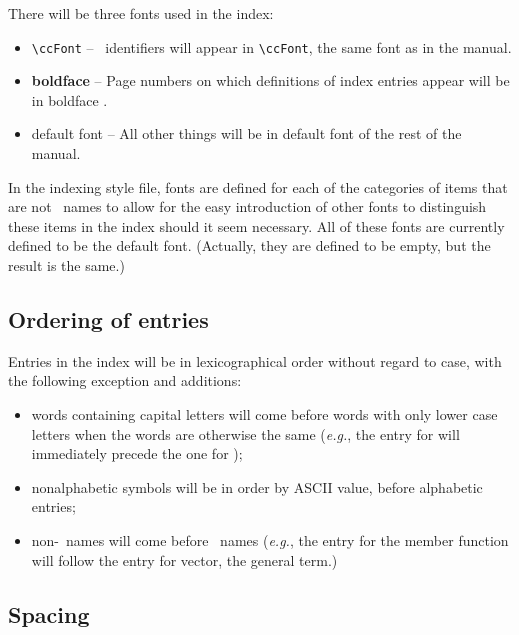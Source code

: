 \documentclass[11pt]{article}
\begin{document}
There will be three fonts used in the index:
\begin{itemize}
   \item {\verb|\ccFont| } -- \CC\ identifiers will appear in \verb|\ccFont|,
         the same font as in the manual.
   \item {\bf boldface} -- Page numbers on which definitions
         of index entries appear will be in boldface%
         .
   \item {default font} -- All other things will be in default font
         of the rest of the manual.
\end{itemize}

In the indexing style file, fonts are defined for each of the categories
of items that are not \CC\ names to allow for the easy introduction of other
fonts to distinguish these items in the index should it seem necessary.  
All of these fonts are currently defined to be the default font.
(Actually, they are defined to be empty, but the result is the same.)%

\subsection{Ordering of entries}%
%
\label{ordering}

Entries in the index will be in lexicographical order without regard to
case, with the following exception and additions:  
\begin{itemize}
   \item words containing capital letters will come before words with
         only lower case letters when the words
         are otherwise the same
         ({\em e.g.}, the entry for  will 
          immediately precede the one for );
   \item nonalphabetic symbols will be in order by ASCII value, before 
         alphabetic entries;  
   \item non-\CC\ names will come before \CC\ names
         ({\em e.g.}, the entry for the member function  
          will follow the entry for vector, the general term.)
\end{itemize}
%

\subsection{Spacing}%
\label{spacing}
\end{document}
